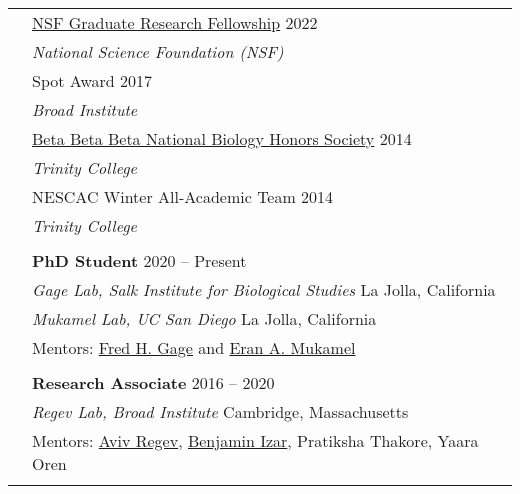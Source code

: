 \documentclass[letterpaper, 11pt]{article}
\begin{document}
\begin{longtable}{p{1.6in}p{4.9in}}

{\color{OliveGreen}{Honors and}} 
{\color{OliveGreen}{Awards}} 
& \href{https://www.nsfgrfp.orgresources/about-grfp/}{NSF Graduate Research Fellowship} \hfill 2022\\
& \hspace{0.1in} \textit{National Science Foundation (NSF)} \\
& Spot Award \hfill 2017 \\
& \hspace{0.1in} \textit{Broad Institute} \\
& \href{https://www.tribeta.org/about-beta-beta-beta}{Beta Beta Beta National Biology Honors Society} \hfill 2014 \\
& \hspace{0.1in} \textit{Trinity College} \\
& NESCAC Winter All-Academic Team \hfill 2014 \\
& \hspace{0.1in} \textit{Trinity College} \\
& \\


{\color{OliveGreen}{Research experience}}
& \textbf{PhD Student} \hfill 2020 -- Present   \\
& \textit{Gage Lab, Salk Institute for Biological Studies} \hfill La Jolla, California \\
& \textit{Mukamel Lab, UC San Diego} \hfill La Jolla, California \\
& Mentors: \href{https://www.salk.edu/scientist/rusty-gage/}{Fred H. Gage} and 
\href{https://cogsci.ucsd.edu/people/faculty/eran-mukamel.html}{Eran A. Mukamel} \\
& \\
 
& \textbf{Research Associate} \hfill 2016 -- 2020  \\
& \textit{Regev Lab, Broad Institute} \hfill Cambridge, Massachusetts \\
& Mentors: \href{https://www.roche.com/about/leadership/aviv-regev}{Aviv Regev}, 
\href{https://www.cancer.columbia.edu/profile/benjamin-izar-md}{Benjamin Izar}, 
Pratiksha Thakore, 
Yaara Oren \\
& \\


\end{longtable}
\end{document}
